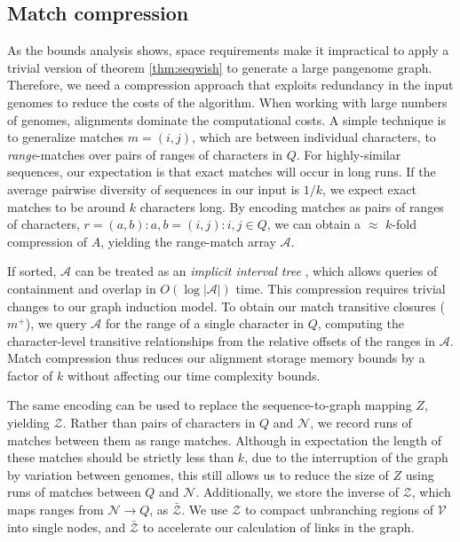 \documentclass{bioinfo}
\theoremstyle{definition}
\begin{document}

\subsection{Match compression}
\label{sec:matchcompression}

As the bounds analysis shows, space requirements make it impractical to apply a trivial version of theorem \ref{thm:seqwish} to generate a large pangenome graph.
Therefore, we need a compression approach that exploits redundancy in the input genomes to reduce the costs of the algorithm.
When working with large numbers of genomes, alignments dominate the computational costs.
A simple technique is to generalize matches $m = (i, j)$, which are between individual characters, to \textit{range}-matches over pairs of ranges of characters in $Q$.
For highly-similar sequences, our expectation is that exact matches will occur in long runs.
If the average pairwise diversity of sequences in our input is $1/k$, we expect exact matches to be around $k$ characters long.
By encoding matches as pairs of ranges of characters, $r = (a, b) : a, b = (i, j) : i, j \in Q$, we can obtain a $\approx$ $k$-fold compression of $A$, yielding the range-match array $\mathcal{A}$.

If sorted, $\mathcal{A}$ can be treated as an \textit{implicit interval tree} \citep{Li_bedtk_2020}, which allows queries of containment and overlap in $O(\log |\mathcal{A}|)$ time.
This compression requires trivial changes to our graph induction model.
To obtain our match transitive closures ($m^+$), we query $\mathcal{A}$ for the range of a single character in $Q$, computing the character-level transitive relationships from the relative offsets of the ranges in $\mathcal{A}$.
Match compression thus reduces our alignment storage memory bounds by a factor of $k$ without affecting our time complexity bounds.

The same encoding can be used to replace the sequence-to-graph mapping $Z$, yielding $\mathcal{Z}$.
Rather than pairs of characters in $Q$ and $\mathcal{N}$, we record runs of matches between them as range matches.
Although in expectation the length of these matches should be strictly less than $k$, due to the interruption of the graph by variation between genomes, this still allows us to reduce the size of $Z$ using runs of matches between $Q$ and $\mathcal{N}$.
Additionally, we store the inverse of $\mathcal{Z}$, which maps ranges from $\mathcal{N} \to Q$, as $\bar{\mathcal{Z}}$.
We use $\mathcal{Z}$ to compact unbranching regions of $\mathcal{V}$ into single nodes, and $\bar{\mathcal{Z}}$ to accelerate our calculation of links in the graph.
\end{document}
